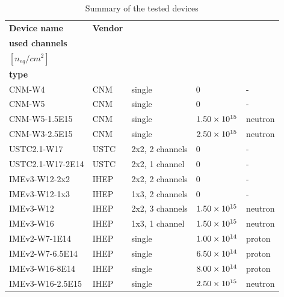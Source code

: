 \begin{table}[!ht]
    \centering
    \captionsetup{width=\captionwidth}
    \caption{Summary of the tested devices}
    \label{tab:devices_tested}

    \begin{tabularx}{.77\textwidth}{|l|l|l|l|X|}
    \hline %
        \textbf{Device name} & \textbf{Vendor} & \begin{tabular}{@{}l@{}}\textbf{Pads,} \\ \textbf{used channels}\end{tabular} & \begin{tabular}{@{}l@{}}\textbf{Fluence} \\ $[n_{eq}/\si{cm^2}]$ \end{tabular} & \begin{tabular}{@{}l@{}} \textbf{Radiation} \\ \textbf{type} \end{tabular} \\
        \hline
        CNM-W4  & CNM & single & 0 & -  \\ 
        CNM-W5  & CNM & single & 0 & -  \\ 
        CNM-W5-1.5E15  & CNM & single & $\num{1.50E+15}$ & neutron  \\ 
        CNM-W3-2.5E15  & CNM & single & $\num{2.50E+15}$ & neutron  \\ 
        USTC2.1-W17 & USTC & 2x2, 2 channels  & 0 & -  \\ 
        USTC2.1-W17-2E14 & USTC & 2x2, 1 channel & 0 & - \\ 
        IMEv3-W12-2x2  & IHEP & 2x2, 2 channels  & 0 & -  \\ 
        IMEv3-W12-1x3  & IHEP & 1x3, 2 channels  & 0 & -  \\ 
        IMEv3-W12  & IHEP & 2x2, 3 channels  & $\num{1.50E+15}$ & neutron  \\ 
        IMEv3-W16  & IHEP & 1x3, 1 channel  & $\num{1.50E+15}$ & neutron  \\ 
        IMEv2-W7-1E14  & IHEP & single & $\num{1.00E+14}$ & proton  \\ 
        IMEv2-W7-6.5E14  & IHEP & single & $\num{6.50E+14}$ & proton  \\ 
        IMEv3-W16-8E14  & IHEP & single & $\num{8.00E+14}$ & proton  \\
        IMEv3-W16-2.5E15  & IHEP & single & $\num{2.50E+15}$ & neutron  \\ 
        \hline
    \end{tabularx}
\end{table}